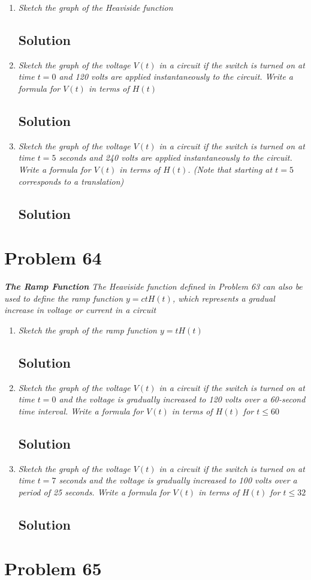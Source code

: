 \documentclass[11pt]{article}
\newcommand{\soln}{\subsection*}
\newcommand{\qn}{\textit}
\begin{document}
\begin{enumerate}
	\item \qn{Sketch the graph of the Heaviside function}
	\soln{Solution}
	
	\item \qn{Sketch the graph of the voltage $V(t)$ in a circuit if the switch is turned on at time $t=0$ and 120 volts are applied instantaneously to the circuit. Write a formula for $V(t)$ in terms of $H(t)$}
	\soln{Solution}
	
	\item \qn{Sketch the graph of the voltage $V(t)$ in a circuit if the switch is turned on at time $t=5$ seconds and 240 volts are applied instantaneously to the circuit. Write a formula for $V(t)$ in terms of $H(t)$. (Note that starting at $t=5$ corresponds to a translation)}
	\soln{Solution}
\end{enumerate}

\section*{Problem 64}

\qn{\textbf{The Ramp Function} The Heaviside function defined in Problem 63 can also be used to define the ramp function $y=ctH(t)$, which represents a gradual increase in voltage or current in a circuit}

\begin{enumerate}
	\item \qn{Sketch the graph of the ramp function $y=tH(t)$}
	\soln{Solution}
	
	\item \qn{Sketch the graph of the voltage $V(t)$ in a circuit if the switch is turned on at time $t=0$ and the voltage is gradually increased to 120 volts over a 60-second time interval. Write a formula for $V(t)$ in terms of $H(t)$ for $t \le 60$}
	\soln{Solution}
	
	\item \qn{Sketch the graph of the voltage $V(t)$ in a circuit if the switch is turned on at time $t=7$ seconds and the voltage is gradually increased to 100 volts over a period of 25 seconds. Write a formula for $V(t)$ in terms of $H(t)$ for $t \le 32$}
	\soln{Solution}
\end{enumerate}

\section*{Problem 65}
\end{document}
